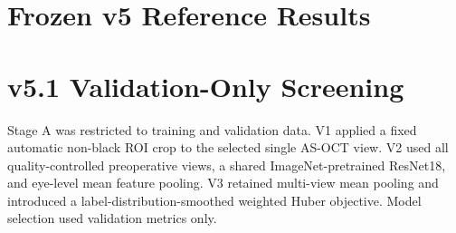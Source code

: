 \section{Frozen v5 Reference Results}

\begin{table}[!htbp]
\centering
\caption{Frozen v5 cohort composition.}
\label{tab:supp_v5_cohort}
\footnotesize
{}
\end{table}

\begin{table}[!htbp]
\centering
\caption{Frozen v5 primary and repeated patient-level results.}
\label{tab:supp_v5_main}
\footnotesize
{}
\end{table}

\section{v5.1 Validation-Only Screening}

Stage A was restricted to training and validation data. V1 applied a fixed automatic non-black ROI crop to the selected single AS-OCT view. V2 used all quality-controlled preoperative views, a shared ImageNet-pretrained ResNet18, and eye-level mean feature pooling. V3 retained multi-view mean pooling and introduced a label-distribution-smoothed weighted Huber objective. Model selection used validation metrics only.

